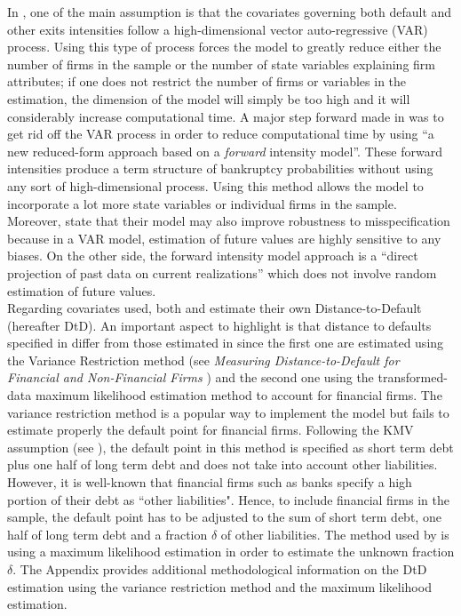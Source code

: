 In \citet{DSW}, one of the main assumption is that the covariates governing both default and other exits intensities follow a high-dimensional vector auto-regressive (VAR) process. Using this type of process forces the model to greatly reduce either the number of firms in the sample or the number of state variables explaining firm attributes; if one does not restrict the number of firms or variables in the estimation, the dimension of the model will simply be too high and it will considerably increase computational time. A major step forward made in \citet{Duan2012} was to get rid off the VAR process in order to reduce computational time by using ``a new reduced-form approach based on a \textit{forward} intensity model''. These forward intensities produce a term structure of bankruptcy probabilities without using any sort of high-dimensional process. Using this method allows the model to incorporate a lot more state variables or individual firms in the sample. Moreover, \citet{Duan2012} state that their model may also improve robustness to misspecification because in a VAR model, estimation of future values are highly sensitive to any biases. On the other side, the forward intensity model approach is a ``direct projection of past data on current realizations'' which does not involve random estimation of future values. \\
Regarding covariates used, both \citet{Duan2012} and \citet{DSW} estimate their own Distance-to-Default (hereafter DtD). An important aspect to highlight is that distance to defaults specified in \citet{DSW} differ from those estimated in \citet{Duan2012} since the first one are estimated using the Variance Restriction method (see \textit{Measuring Distance-to-Default for Financial and Non-Financial Firms} \citep{Duan2012DTD}) and the second one using the transformed-data maximum likelihood estimation method to account for financial firms. The variance restriction method is a popular way to implement the \citet{Merton1974} model but fails to estimate properly the default point for financial firms. Following the KMV assumption (see \citet{KMV}), the default point in this method is specified as short term debt plus one half of long term debt and does not take into account other liabilities. However, it is well-known that financial firms such as banks specify a high portion of their debt as ``other liabilities". Hence, to include financial firms in the sample, the default point has to be adjusted to the sum of short term debt, one half of long term debt and a fraction $\delta$ of other liabilities. The method used by \citet{Duan2012} is using a maximum likelihood estimation in order to estimate the unknown fraction $\delta$. The Appendix provides additional methodological information on the DtD estimation using the variance restriction method and the maximum likelihood estimation. \\ 
